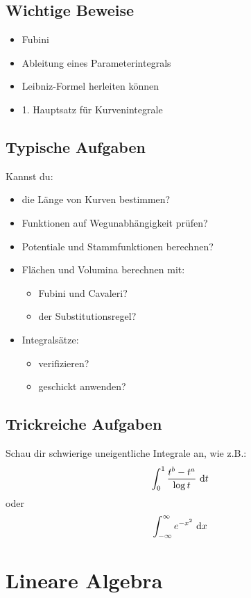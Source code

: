 \subsection{Wichtige Beweise}
\begin{itemize}
	\item Fubini
	\item Ableitung eines Parameterintegrals
	\item Leibniz-Formel herleiten können
	\item 1. Hauptsatz für Kurvenintegrale
\end{itemize}

\subsection{Typische Aufgaben}
Kannst du:
\begin{itemize}
	\item die Länge von Kurven bestimmen?
	\item Funktionen auf Wegunabhängigkeit prüfen?
	\item Potentiale und Stammfunktionen berechnen?
	\item Flächen und Volumina berechnen mit:
	\begin{itemize}
		\item Fubini und Cavaleri?
		\item der Substitutionsregel?
	\end{itemize}
	\item Integralsätze:
	\begin{itemize}
		\item verifizieren?
		\item geschickt anwenden?
	\end{itemize}
\end{itemize}

\subsection{Trickreiche Aufgaben}
Schau dir schwierige uneigentliche Integrale an, wie z.B.:
\begin{equation*}
	\int_0^1{\frac{t^b-t^a}{\log{t}}\text{ d}t}
\end{equation*}
oder
\begin{equation*}
	\int_{-\infty}^{\infty}{e^{-x^2}\text{ d}x}
\end{equation*}

\section{Lineare Algebra}

